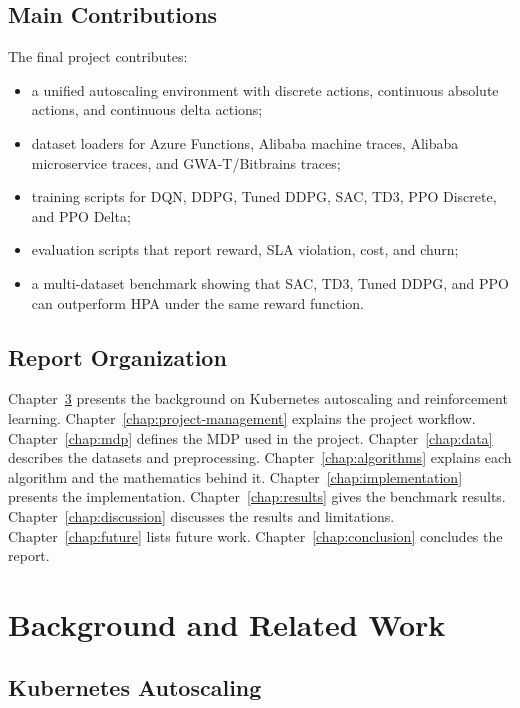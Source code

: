 \documentclass{rapportINPTCLOUD}
\begin{document}
\section{Main Contributions}

The final project contributes:

\begin{itemize}
  \item a unified autoscaling environment with discrete actions, continuous absolute actions, and continuous delta actions;
  \item dataset loaders for Azure Functions, Alibaba machine traces, Alibaba microservice traces, and GWA-T/Bitbrains traces;
  \item training scripts for DQN, DDPG, Tuned DDPG, SAC, TD3, PPO Discrete, and PPO Delta;
  \item evaluation scripts that report reward, SLA violation, cost, and churn;
  \item a multi-dataset benchmark showing that SAC, TD3, Tuned DDPG, and PPO can outperform HPA under the same reward function.
\end{itemize}

\section{Report Organization}

Chapter~\ref{chap:background} presents the background on Kubernetes autoscaling and reinforcement learning. Chapter~\ref{chap:project-management} explains the project workflow. Chapter~\ref{chap:mdp} defines the MDP used in the project. Chapter~\ref{chap:data} describes the datasets and preprocessing. Chapter~\ref{chap:algorithms} explains each algorithm and the mathematics behind it. Chapter~\ref{chap:implementation} presents the implementation. Chapter~\ref{chap:results} gives the benchmark results. Chapter~\ref{chap:discussion} discusses the results and limitations. Chapter~\ref{chap:future} lists future work. Chapter~\ref{chap:conclusion} concludes the report.

\chapter{Background and Related Work}
\label{chap:background}

\section{Kubernetes Autoscaling}
\end{document}
